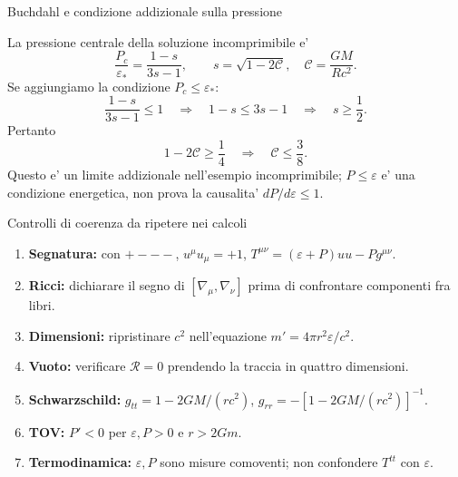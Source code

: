 \begin{frame}[t]{Buchdahl e condizione addizionale sulla pressione}\small\raggedright

La pressione centrale della soluzione incomprimibile e'
\[
\frac{P_c}{\varepsilon_*}=\frac{1-s}{3s-1},
\qquad s=\sqrt{1-2\mathcal C},\quad \mathcal C=\frac{GM}{Rc^2}.
\]
Se aggiungiamo la condizione $P_c\leq\varepsilon_*$:
\[
\frac{1-s}{3s-1}\leq1
\quad\Longrightarrow\quad
1-s\leq3s-1
\quad\Longrightarrow\quad s\geq\frac12.
\]
Pertanto
\[
1-2\mathcal C\geq\frac14
\quad\Longrightarrow\quad \mathcal C\leq\frac38.
\]
Questo e' un limite addizionale nell'esempio incomprimibile; $P\leq\varepsilon$ e' una condizione energetica, non prova la causalita' $dP/d\varepsilon\leq1$.

\end{frame}

\begin{frame}[t]{Controlli di coerenza da ripetere nei calcoli}\small\raggedright

\begin{enumerate}
\item \textbf{Segnatura:} con $+---$, $u^\mu u_\mu=+1$, $T^{\mu\nu}=(\varepsilon+P)uu-Pg^{\mu\nu}$.
\item \textbf{Ricci:} dichiarare il segno di $[\nabla_\mu,\nabla_\nu]$ prima di confrontare componenti fra libri.
\item \textbf{Dimensioni:} ripristinare $c^2$ nell'equazione $m'=4\pi r^2\varepsilon/c^2$.
\item \textbf{Vuoto:} verificare $\mathcal R=0$ prendendo la traccia in quattro dimensioni.
\item \textbf{Schwarzschild:} $g_{tt}=1-2GM/(rc^2)$, $g_{rr}=-[1-2GM/(rc^2)]^{-1}$.
\item \textbf{TOV:} $P'<0$ per $\varepsilon,P>0$ e $r>2Gm$.
\item \textbf{Termodinamica:} $\varepsilon, P$ sono misure comoventi; non confondere $T^{tt}$ con $\varepsilon$.
\end{enumerate}

\end{frame}

